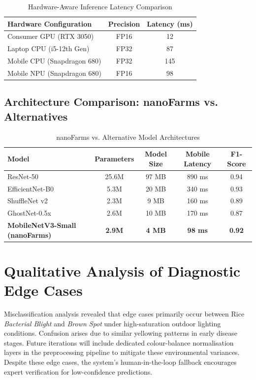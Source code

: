 \documentclass[12pt,oneside]{report}
\begin{document}
\begin{table}[H]
\centering
\caption{Hardware-Aware Inference Latency Comparison}
\begin{tabular}{@{}lcc@{}}
\toprule
\textbf{Hardware Configuration} & \textbf{Precision} & \textbf{Latency (ms)} \\ \midrule
Consumer GPU (RTX 3050)   & FP16 & 12 \\
Laptop CPU (i5-12th Gen)  & FP32 & 87 \\
Mobile CPU (Snapdragon 680) & FP32 & 145 \\
Mobile NPU (Snapdragon 680) & FP16 & 98 \\ \bottomrule
\end{tabular}
\end{table}

\subsection{Architecture Comparison: nanoFarms vs. Alternatives}

\begin{table}[H]
\centering
\caption{nanoFarms vs. Alternative Model Architectures}
\begin{tabular}{@{}lcccc@{}}
\toprule
\textbf{Model} & \textbf{Parameters} & \textbf{Model Size} & \textbf{Mobile Latency} & \textbf{F1-Score} \\ \midrule
ResNet-50       & 25.6M & 97 MB  & 890 ms & 0.94 \\
EfficientNet-B0 & 5.3M  & 20 MB  & 340 ms & 0.93 \\
ShuffleNet v2   & 2.3M  & 9 MB   & 160 ms & 0.89 \\
GhostNet-0.5x   & 2.6M  & 10 MB  & 170 ms & 0.87 \\
\textbf{MobileNetV3-Small (nanoFarms)} & \textbf{2.9M} & \textbf{4 MB} & \textbf{98 ms} & \textbf{0.92} \\ \bottomrule
\end{tabular}
\end{table}

\section{Qualitative Analysis of Diagnostic Edge Cases}
Misclassification analysis revealed that edge cases primarily occur between Rice \textit{Bacterial Blight} and \textit{Brown Spot} under high-saturation outdoor lighting conditions. Confusion arises due to similar yellowing patterns in early disease stages. Future iterations will include dedicated colour-balance normalisation layers in the preprocessing pipeline to mitigate these environmental variances. Despite these edge cases, the system's human-in-the-loop fallback encourages expert verification for low-confidence predictions.
\end{document}
